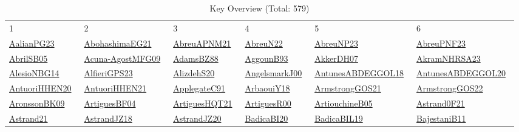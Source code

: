 \begin{longtable}{*{6}{l}}
\rowcolor{white}\caption{Key Overview (Total: 579)}\\ \toprule
\rowcolor{white}1 & 2 & 3 & 4 & 5 & 6\\ \midrule
\endhead
\bottomrule
\endfoot
\href{works/AalianPG23.pdf}{AalianPG23}~\cite{AalianPG23} & \href{works/AbohashimaEG21.pdf}{AbohashimaEG21}~\cite{AbohashimaEG21} & \href{works/AbreuAPNM21.pdf}{AbreuAPNM21}~\cite{AbreuAPNM21} & \href{works/AbreuN22.pdf}{AbreuN22}~\cite{AbreuN22} & \href{works/AbreuNP23.pdf}{AbreuNP23}~\cite{AbreuNP23} & \href{}{AbreuPNF23}~\cite{AbreuPNF23}\\ 
\href{works/AbrilSB05.pdf}{AbrilSB05}~\cite{AbrilSB05} & \href{works/Acuna-AgostMFG09.pdf}{Acuna-AgostMFG09}~\cite{Acuna-AgostMFG09} & \href{works/AdamsBZ88.pdf}{AdamsBZ88}~\cite{AdamsBZ88} & \href{works/AggounB93.pdf}{AggounB93}~\cite{AggounB93} & \href{works/AkkerDH07.pdf}{AkkerDH07}~\cite{AkkerDH07} & \href{works/AkramNHRSA23.pdf}{AkramNHRSA23}~\cite{AkramNHRSA23}\\ 
\href{works/AlesioNBG14.pdf}{AlesioNBG14}~\cite{AlesioNBG14} & \href{works/AlfieriGPS23.pdf}{AlfieriGPS23}~\cite{AlfieriGPS23} & \href{}{AlizdehS20}~\cite{AlizdehS20} & \href{works/AngelsmarkJ00.pdf}{AngelsmarkJ00}~\cite{AngelsmarkJ00} & \href{works/AntunesABDEGGOL18.pdf}{AntunesABDEGGOL18}~\cite{AntunesABDEGGOL18} & \href{works/AntunesABDEGGOL20.pdf}{AntunesABDEGGOL20}~\cite{AntunesABDEGGOL20}\\ 
\href{works/AntuoriHHEN20.pdf}{AntuoriHHEN20}~\cite{AntuoriHHEN20} & \href{works/AntuoriHHEN21.pdf}{AntuoriHHEN21}~\cite{AntuoriHHEN21} & \href{works/ApplegateC91.pdf}{ApplegateC91}~\cite{ApplegateC91} & \href{works/ArbaouiY18.pdf}{ArbaouiY18}~\cite{ArbaouiY18} & \href{works/ArmstrongGOS21.pdf}{ArmstrongGOS21}~\cite{ArmstrongGOS21} & \href{works/ArmstrongGOS22.pdf}{ArmstrongGOS22}~\cite{ArmstrongGOS22}\\ 
\href{works/AronssonBK09.pdf}{AronssonBK09}~\cite{AronssonBK09} & \href{works/ArtiguesBF04.pdf}{ArtiguesBF04}~\cite{ArtiguesBF04} & \href{}{ArtiguesHQT21}~\cite{ArtiguesHQT21} & \href{works/ArtiguesR00.pdf}{ArtiguesR00}~\cite{ArtiguesR00} & \href{works/ArtiouchineB05.pdf}{ArtiouchineB05}~\cite{ArtiouchineB05} & \href{works/Astrand0F21.pdf}{Astrand0F21}~\cite{Astrand0F21}\\ 
\href{works/Astrand21.pdf}{Astrand21}~\cite{Astrand21} & \href{works/AstrandJZ18.pdf}{AstrandJZ18}~\cite{AstrandJZ18} & \href{works/AstrandJZ20.pdf}{AstrandJZ20}~\cite{AstrandJZ20} & \href{works/BadicaBI20.pdf}{BadicaBI20}~\cite{BadicaBI20} & \href{works/BadicaBIL19.pdf}{BadicaBIL19}~\cite{BadicaBIL19} & \href{works/BajestaniB11.pdf}{BajestaniB11}~\cite{BajestaniB11}\\ 

\end{longtable}
